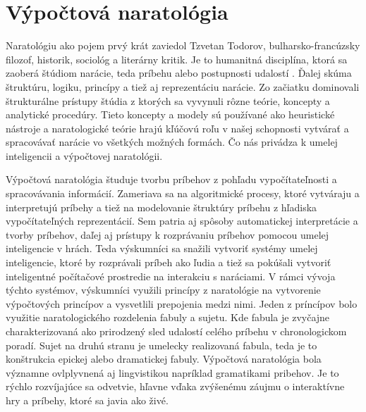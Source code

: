 \section{Výpočtová naratológia}
Naratológiu ako pojem prvý krát zaviedol Tzvetan Todorov, bulharsko-francúzsky filozof, historik, sociológ a literárny kritik. Je to humanitná disciplína, ktorá sa zaoberá štúdiom narácie, teda príbehu alebo postupnosti udalostí \cite{narrat}. Ďalej skúma štruktúru, logiku, princípy a tiež aj reprezentáciu narácie. Zo začiatku dominovali štrukturálne prístupy štúdia z ktorých sa vyvynuli rôzne teórie, koncepty a analytické procedúry. Tieto koncepty a modely sú používané ako heuristické nástroje a naratologické teórie hrajú kľúčovú roľu v našej schopnosti vytvárať a spracovávať narácie vo všetkých možných formách. Čo nás privádza k umelej inteligencii a výpočtovej naratológii.\par
Výpočtová naratológia študuje tvorbu príbehov z pohľadu vypočítateľnosti a spracovávania informácií. Zameriava sa na algoritmické procesy, ktoré vytváraju a interpretujú príbehy a tiež na modelovanie štruktúry príbehu z hľadiska vypočítateľných reprezentácií. Sem patria aj spôsoby automatickej interpretácie a tvorby príbehov, daľej aj prístupy k rozprávaniu príbehov pomocou umelej inteligencie v hrách. Teda výskumníci sa snažili vytvoriť systémy umelej inteligencie, ktoré by rozprávali príbeh ako ľudia a tiež sa pokúšali vytvoriť inteligentné počítačové prostredie na interakciu s naráciami. V rámci vývoja týchto systémov, výskumníci využili princípy z naratológie na vytvorenie výpočtových princípov a vysvetlili prepojenia medzi nimi. Jeden z príncípov bolo využitie naratologického rozdelenia fabuly a sujetu. Kde fabula je zvyčajne charakterizovaná ako prirodzený sled udalostí celého príbehu v chronologickom poradí. Sujet na druhú stranu je umelecky realizovaná fabula, teda je to konštrukcia epickej alebo dramatickej fabuly. Výpočtová naratológia bola významne ovlplyvnená aj lingvistikou napríklad gramatikami pribehov. Je to rýchlo rozvíjajúce sa odvetvie, hľavne vďaka zvýšenému záujmu o interaktívne hry a príbehy, ktoré sa javia ako živé.
